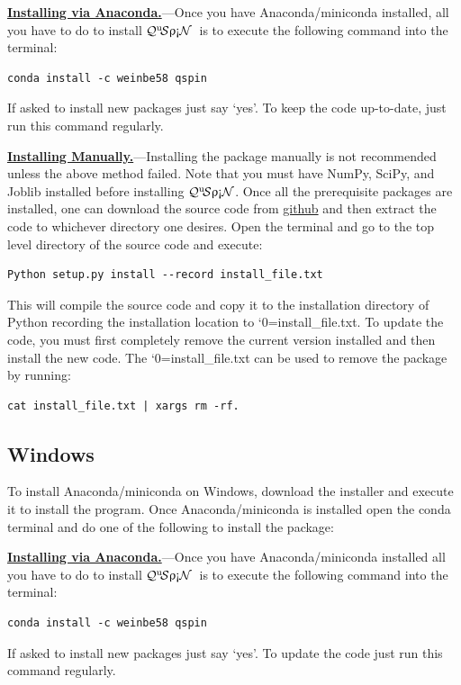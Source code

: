 \documentclass{SciPost}
\newcommand\0{\scalebox{-1}[1]{0}}
\let\svttfamily\ttfamily
\renewcommand\ttfamily{\svttfamily\catcode`0=\active }
\renewcommand\texttt{\bgroup\ttfamily\texttthelp}
\def\texttthelp#1{#1\egroup}
\newcommand{\qspin}{$\mathcal{Q}^{\mathrm{u}}\!\mathcal{S}\uprho\mathrm{\text{\textexclamdown}}\mathcal{N}$}
\begin{document}
\begin{appendix}
\underline{\bf Installing via Anaconda.}---Once you have Anaconda/miniconda installed, all you have to do to install \qspin\ is to execute the following command into the terminal: 
\begin{lstlisting}[numbers=none]
conda install -c weinbe58 qspin
\end{lstlisting}
If asked to install new packages just say `yes'. To keep the code up-to-date, just run this command regularly. 

\underline{\bf Installing Manually.}---Installing the package manually is not recommended unless the above method failed. Note that you must have NumPy, SciPy, and Joblib installed before installing \qspin. Once all the prerequisite packages are installed, one can download the source code from \href{https://github.com/weinbe58/qspin/tree/master}{github} and then extract the code to whichever directory one desires. Open the terminal and go to the top level directory of the source code and execute:
\begin{lstlisting}[numbers=none]  
Python setup.py install --record install_file.txt
\end{lstlisting}
This will compile the source code and copy it to the installation directory of Python recording the installation location to \texttt{install\_file.txt}. To update the code, you must first completely remove the current version installed and then install the new code. The \texttt{install\_file.txt} can be used to remove the package by running:  
\begin{lstlisting}[numbers=none]  
cat install_file.txt | xargs rm -rf. 
\end{lstlisting}

\subsection{Windows}
To install Anaconda/miniconda on Windows, download the installer and execute it to install the program. Once Anaconda/miniconda is installed open the conda terminal and do one of the following to install the package:

\underline{\bf Installing via Anaconda.}---Once you have Anaconda/miniconda installed all you have to do to install \qspin\ is to execute the following command into the terminal: 
\begin{lstlisting}[numbers=none]
conda install -c weinbe58 qspin
\end{lstlisting}
If asked to install new packages just say `yes'. To update the code just run this command regularly. 


\end{appendix}
\end{document}
